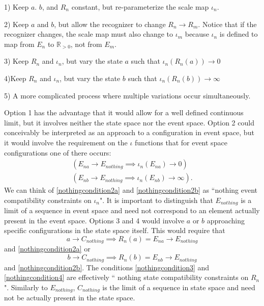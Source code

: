 \documentclass[11pt,a4paper]{article}
\begin{document}
1) Keep $a$. $b$, and $R_n$ constant, but re-parameterize the scale map $\iota_n$.

2) Keep $a$ and $b$, but allow the recognizer to change $R_n\rightarrow R_m$. Notice that if the recognizer changes, the scale map must also change to $\iota_m$ because $\iota_n$ is defined to map from $E_n$ to $\mathbb{R}_{>0}$, not from $E_m$.

3) Keep $R_n$ and $\iota_n$, but vary the state $a$ such that $\iota_n(R_n(a))\rightarrow0$

4)Keep $R_n$ and $\iota_n$, but vary the state $b$ such that $\iota_n(R_n(b))\rightarrow\infty$

5) A more complicated process where multiple variations occur simultaneously.

Option 1 has the advantage that it would allow for a well defined continuous limit, but it involves neither the state space nor the event space. Option 2 could conceivably be interpreted as an approach to a configuration in event space, but it would involve the requirement on the $\iota$ functions that for event space configurations one of there occurs:
\begin{align}
   (E_{na}\rightarrow E_{nothing}\implies\iota_n(E_{na})\rightarrow0)\label{nothingcondition2a}\\
   (E_{nb}\rightarrow E_{nothing}\implies\iota_n(E_{nb})\rightarrow\infty)\label{nothingcondition2b}.
\end{align}
We can think of \ref{nothingcondition2a} and \ref{nothingcondition2b} as ``nothing event compatibility constraints on $\iota_n$". It is important to distinguish that $E_{nothing}$ is a limit of a sequence in event space and need not correspond to an element actually present in the event space. Options 3 and 4 would involve $a$ or $b$ approaching specific configurations in the state space itself. This would require that
\begin{equation}
   a\rightarrow C_{nothing}\implies R_n(a)=E_{na}\rightarrow E_{nothing} \label{nothingcondition3}
\end{equation}
and \ref{nothingcondition2a} or
\begin{equation}
   b\rightarrow C_{nothing}\implies R_n(b)=E_{nb}\rightarrow E_{nothing} \label{nothingcondition4}
\end{equation}
and \ref{nothingcondition2b}. The conditions \ref{nothingcondition3} and \ref{nothingcondition4} are effectively `` nothing state compatibility constraints on $R_n$". Similarly to $E_{nothing}$, $C_{nothing}$ is the limit of a sequence in state space and need not be actually present in the state space.
\end{document}
